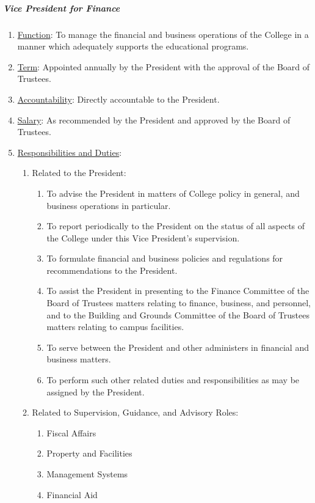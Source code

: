 \documentclass[letterpaper, 11pt]{article}
\begin{document}
				\subparagraph{Vice President for Finance}
					\begin{enumerate}
						\item{\underline{Function}: To manage the financial and business operations of the College in a manner which adequately supports the educational programs.}
						\item{\underline{Term}: Appointed annually by the President with the approval of the Board of Trustees.}
						\item{\underline{Accountability}: Directly accountable to the President.}
						\item{\underline{Salary}: As recommended by the President and approved by the Board of Trustees.}
						\item{\underline{Responsibilities and Duties}:
							\begin{enumerate}
								\item{Related to the President:
									\begin{enumerate}
										\item{To advise the President in matters of College policy in general, and business operations in particular.}
										\item{To report periodically to the President on the status of all aspects of the College under this Vice President's supervision.}
										\item{To formulate financial and business policies and regulations for recommendations to the President.}
										\item{To assist the President in presenting to the Finance Committee of the Board of Trustees matters relating to finance, business, and personnel, and to the Building and Grounds Committee of the Board of Trustees matters relating to campus facilities.}
										\item{To serve between the President and other administers in financial and business matters.}
										\item{To perform such other related duties and responsibilities as may be assigned by the President.}
									\end{enumerate}
								}
								\item{Related to Supervision, Guidance, and Advisory Roles:
									\begin{enumerate}
										\item{Fiscal Affairs}
										\item{Property and Facilities}
										\item{Management Systems}
										\item{Financial Aid}
									\end{enumerate}
								}
							\end{enumerate}
						}
					\end{enumerate}
\end{document}
